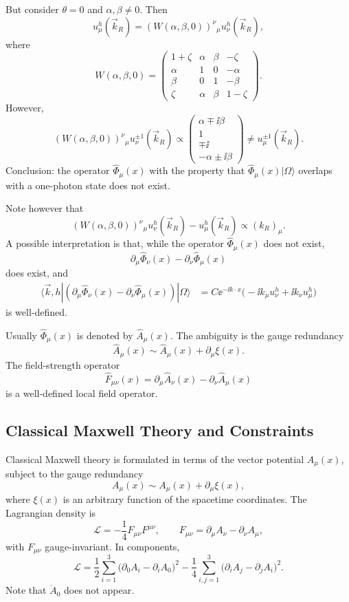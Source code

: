 But consider \(\theta=0\) and \(\alpha,\beta\neq0\).  Then
\[
  u_\mu^h(\vec k_R)
  =
  (W(\alpha,\beta,0))^\nu{}_\mu u_\nu^h(\vec k_R),
\]
where
\[
  W(\alpha,\beta,0)
  =
  \begin{pmatrix}
    1+\zeta&\alpha&\beta&-\zeta\\
    \alpha&1&0&-\alpha\\
    \beta&0&1&-\beta\\
    \zeta&\alpha&\beta&1-\zeta
  \end{pmatrix}.
\]
However,
\[
  (W(\alpha,\beta,0))^\nu{}_\mu u_\nu^{\pm1}(\vec k_R)
  \propto
  \begin{pmatrix}
    \alpha\mp \ii\beta\\
    1\\
    \mp \ii\\
    -\alpha\pm \ii\beta
  \end{pmatrix}
  \neq u_\mu^{\pm1}(\vec k_R).
\]
Conclusion: the operator \(\widehat\Phi_\mu(x)\) with the property that
\(\widehat\Phi_\mu(x)|\Omega\rangle\) overlaps with a one-photon state
does not exist.

Note however that
\[
  (W(\alpha,\beta,0))^\nu{}_\mu u_\nu^h(\vec k_R)
  -u_\mu^h(\vec k_R)
  \propto
  (k_R)_\mu.
\]
A possible interpretation is that, while the operator
\(\widehat\Phi_\mu(x)\) does not exist,
\[
  \partial_\mu\widehat\Phi_\nu(x)
  -\partial_\nu\widehat\Phi_\mu(x)
\]
does exist, and
\[
\begin{aligned}
  \langle\vec k,h|
  (\partial_\mu\widehat\Phi_\nu(x)-\partial_\nu\widehat\Phi_\mu(x))
  |\Omega\rangle
  &=
  C\ee^{-\ii k\cdot x}
  \bigl(-\ii k_\mu u_\nu^h+\ii k_\nu u_\mu^h\bigr)
\end{aligned}
\]
is well-defined.

Usually \(\widehat\Phi_\mu(x)\) is denoted by \(\widehat A_\mu(x)\).  The
ambiguity is the gauge redundancy
\[
  \widehat A_\mu(x)\sim\widehat A_\mu(x)+\partial_\mu\xi(x).
\]
The field-strength operator
\[
  \widehat F_{\mu\nu}(x)
  =
  \partial_\mu\widehat A_\nu(x)
  -\partial_\nu\widehat A_\mu(x)
\]
is a well-defined local field operator.

\subsection{Classical Maxwell Theory and Constraints}

Classical Maxwell theory is formulated in terms of the vector potential
\(A_\mu(x)\), subject to the gauge redundancy
\[
  A_\mu(x)\sim A_\mu(x)+\partial_\mu\xi(x),
\]
where \(\xi(x)\) is an arbitrary function of the spacetime coordinates.
The Lagrangian density is
\[
  \mathcal L=-\frac14 F_{\mu\nu}F^{\mu\nu},
  \qquad
  F_{\mu\nu}=\partial_\mu A_\nu-\partial_\nu A_\mu,
\]
with \(F_{\mu\nu}\) gauge-invariant.  In components,
\[
  \mathcal L
  =
  \frac12\sum_{i=1}^3
  \bigl(\partial_0A_i-\partial_iA_0\bigr)^2
  -\frac14\sum_{i,j=1}^3
  \bigl(\partial_iA_j-\partial_jA_i\bigr)^2.
\]
Note that \(\dot A_0\) does not appear.

